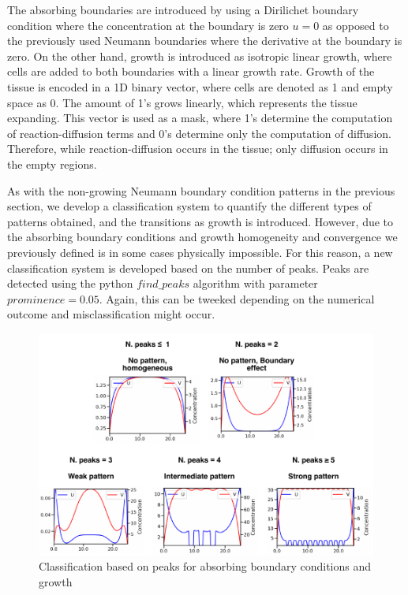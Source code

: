 The absorbing boundaries are introduced by using a Dirilichet boundary condition where the concentration at the boundary is zero $u=0$ as opposed to the previously used Neumann boundaries where the derivative at the boundary is zero.
On the other hand, growth is introduced as isotropic linear growth, where cells are added to both boundaries with a linear growth rate.
Growth of the tissue is encoded in a 1D binary vector, where cells are denoted as 1 and empty space as 0.
The amount of 1's grows linearly, which represents the tissue expanding.
This vector is used as a mask, where 1's determine the computation of reaction-diffusion terms and 0's determine only the computation of diffusion.
Therefore, while reaction-diffusion occurs in the tissue; only diffusion occurs in the empty regions.

As with the non-growing Neumann boundary condition patterns in the previous section, we develop a classification system to quantify the different types of patterns obtained, and the transitions as growth is introduced.
However, due to the absorbing boundary conditions and growth homogeneity and convergence we previously defined is in some cases physically impossible.
For this reason, a new classification system is developed based on the number of peaks.
Peaks are detected using the python $find\_peaks$ algorithm with parameter
$prominence=0.05$.
Again, this can be tweeked depending on the numerical outcome and misclassification might occur.


\begin{figure}[H] %
    \centering
    \begin{adjustbox}{center}
        \includegraphics[width=1\textwidth]{chapters/Chapter 1/peaks_classification} %
    \end{adjustbox}
    \caption{Classification based on peaks for absorbing boundary conditions and growth}
    \label{fig:peaks_classification} %
\end{figure}

